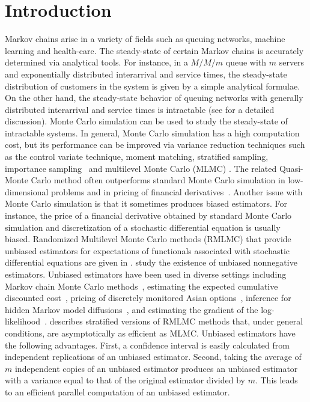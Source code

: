 \documentclass[a4paper,11pt]{article}
\begin{document}
\section{Introduction}
Markov chains arise in a variety of fields such as queuing  networks,  machine learning and health-care. The steady-state  of certain Markov chains   is accurately determined via analytical tools. For instance, in a \(M/M/m\) queue with \(m\) servers and exponentially distributed interarrival  and service times, the steady-state  distribution of customers in the system  is given by a simple analytical formulae. On the other hand, the steady-state behavior of  queuing networks with generally distributed interarrival and service times is intractable (see \cite{BandiBertsimasYoussef2015} for a detailed discussion).  Monte Carlo simulation can be used to study the steady-state of intractable systems. In general,     Monte Carlo simulation has a high computation cost, but its performance can be improved via  variance reduction techniques such as the control variate technique, moment matching, stratified sampling, importance sampling~\cite{glasserman2004Monte,asmussenGlynn2007} and multilevel Monte Carlo (MLMC) \cite{giles2015multilevel}. The related  Quasi-Monte Carlo method often outperforms standard Monte Carlo simulation in low-dimensional problems and in pricing of financial derivatives~\cite{glasserman2004Monte}.     
Another issue with Monte Carlo simulation is that it sometimes produces biased estimators. For instance, the price of a financial derivative obtained by standard Monte Carlo simulation and  discretization of a stochastic differential equation  is usually biased. Randomized Multilevel Monte Carlo methods (RMLMC) that provide unbiased estimators for expectations of functionals  associated with    stochastic differential equations are given in
\cite{mcleish2011,GlynnRhee2015unbiased}.
\citet{jacob2015nonnegative} study the existence of unbiased nonnegative estimators. Unbiased estimators   have been used in  diverse settings including   Markov chain Monte Carlo methods~\cite{bardenet2017,agapiou2018unbiased,middleton2018unbiased,jacob2020unbiased},  estimating the expected cumulative discounted cost~\cite{cui2020optimalDisc},  pricing of discretely monitored Asian options~\cite{kahale2020Asian},  inference for hidden Markov model diffusions~\cite{vihola2021unbiasedInference}, and estimating the gradient of the  log-likelihood~\cite{jasra2021unbiased}. \citet{Vihola2018} describes  stratified versions of  RMLMC methods that, under general conditions, are  asymptotically as
efficient as MLMC. Unbiased estimators have the following advantages. First, a confidence interval is easily calculated from independent replications of an unbiased estimator. Second, taking the average of \(m\) independent copies of an unbiased estimator produces an unbiased estimator with a variance equal to that of the original estimator divided by \(m\). This leads to an efficient parallel computation of an unbiased estimator.  
 
\end{document}
